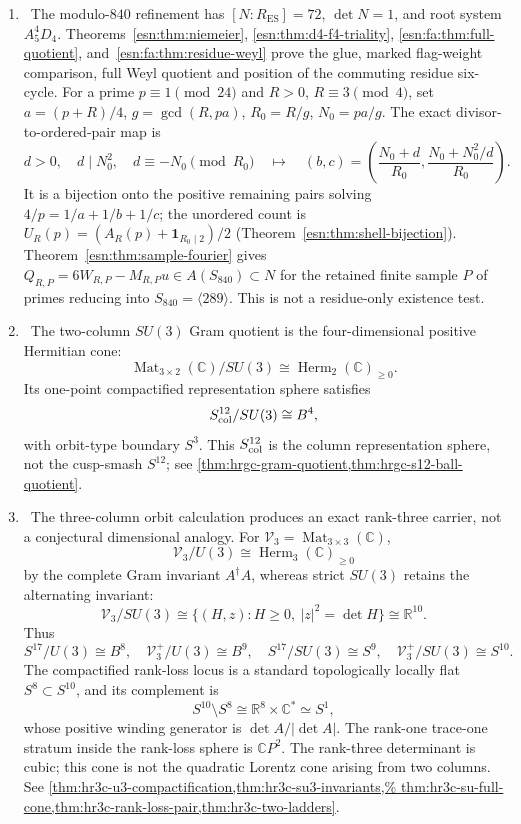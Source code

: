 \begin{enumerate}[leftmargin=1.8em]
\item \Verified\ The modulo-$840$ refinement has
$[N:R_{\mathrm{ES}}]=72$, $\det N=1$, and root system $A_5^4D_4$.
Theorems~\ref{esn:thm:niemeier}, \ref{esn:thm:d4-f4-triality},
\ref{esn:fa:thm:full-quotient}, and~\ref{esn:fa:thm:residue-weyl}
prove the glue, marked flag-weight comparison, full Weyl quotient and
position of the commuting residue six-cycle. For a prime
$p\equiv1\pmod{24}$ and $R>0$, $R\equiv3\pmod4$, set
$a=(p+R)/4$, $g=\gcd(R,pa)$, $R_0=R/g$, $N_0=pa/g$.
The exact divisor-to-ordered-pair map is
\[
 d>0,\quad d\mid N_0^2,\quad d\equiv-N_0\pmod{R_0}
 \quad\longmapsto\quad
 (b,c)=\left(\frac{N_0+d}{R_0},
                  \frac{N_0+N_0^2/d}{R_0}\right).
\]
It is a bijection onto the positive remaining pairs solving
$4/p=1/a+1/b+1/c$; the unordered count is
$U_R(p)=(A_R(p)+\mathbf1_{R_0\mid2})/2$
(Theorem~\ref{esn:thm:shell-bijection}).
Theorem~\ref{esn:thm:sample-fourier} gives
$Q_{R,P}=6W_{R,P}-M_{R,P}u\in A(S_{840})\subset N$ for the
retained finite sample $P$ of primes reducing into
$S_{840}=\langle289\rangle$. This is not a residue-only existence test.

\item \Verified\ The two-column \(SU(3)\) Gram quotient is the
four-dimensional positive Hermitian cone:
\[
 \operatorname{Mat}_{3\times2}(\mathbb C)/SU(3)
 \cong\operatorname{Herm}_2(\mathbb C)_{\geq0}.
\]
Its one-point compactified representation sphere satisfies
\[
 S^{12}_{\rm col}/SU(3)\cong B^4,
\]
with orbit-type boundary \(S^3\).  This \(S^{12}_{\rm col}\) is the column
representation sphere, not the cusp-smash \(S^{12}\); see
\cref{thm:hrgc-gram-quotient,thm:hrgc-s12-ball-quotient}.

\item \Verified\ The three-column orbit calculation produces an exact
rank-three carrier, not a conjectural dimensional analogy.  For
\(\mathscr V_3=\operatorname{Mat}_{3\times3}(\mathbb C)\),
\[
 \mathscr V_3/U(3)\cong\operatorname{Herm}_3(\mathbb C)_{\geq0}
\]
by the complete Gram invariant \(A^\dagger A\), whereas strict \(SU(3)\)
retains the alternating invariant:
\[
 \mathscr V_3/SU(3)
 \cong\{(H,z):H\geq0,\ |z|^2=\det H\}\cong\mathbb R^{10}.
\]
Thus
\[
 S^{17}/U(3)\cong B^8,\quad
 \mathscr V_3^+/U(3)\cong B^9,\quad
 S^{17}/SU(3)\cong S^9,\quad
 \mathscr V_3^+/SU(3)\cong S^{10}.
\]
The compactified rank-loss locus is a standard topologically locally flat
\(S^8\subset S^{10}\), and its complement is
\[
 S^{10}\setminus S^8\cong\mathbb R^8\times\mathbb C^*\simeq S^1,
\]
whose positive winding generator is \(\det A/|\det A|\).  The rank-one
trace-one stratum inside the rank-loss sphere is \(\mathbb CP^2\).  The
rank-three determinant is cubic; this cone is not the quadratic Lorentz cone
arising from two columns.  See
 \cref{thm:hr3c-u3-compactification,thm:hr3c-su3-invariants,%
 thm:hr3c-su-full-cone,thm:hr3c-rank-loss-pair,thm:hr3c-two-ladders}.


\end{enumerate}
